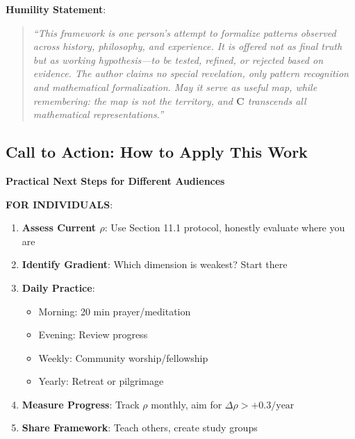 \documentclass[11pt,a4paper]{article}
\theoremstyle{definition}
\theoremstyle{remark}
\begin{document}
\begin{small}
\begin{enumerate}
\begin{protocol}
\begin{mdframed}[backgroundcolor=red!10,linewidth=2pt]
\textbf{Humility Statement}:
\begin{quote}
\textit{``This framework is one person's attempt to formalize patterns observed across history, philosophy, and experience. It is offered not as final truth but as working hypothesis—to be tested, refined, or rejected based on evidence. The author claims no special revelation, only pattern recognition and mathematical formalization. May it serve as useful map, while remembering: the map is not the territory, and \(\mathbf{C}\) transcends all mathematical representations.''}
\end{quote}
\end{mdframed}

\subsection{Call to Action: How to Apply This Work}

\begin{mdframed}[backgroundcolor=green!10,linewidth=2pt]
\textbf{Practical Next Steps for Different Audiences}

\textbf{FOR INDIVIDUALS}:
\begin{enumerate}
    \item \textbf{Assess Current \(\rho\)}: Use Section 11.1 protocol, honestly evaluate where you are
    \item \textbf{Identify Gradient}: Which dimension is weakest? Start there
    \item \textbf{Daily Practice}: 
        \begin{itemize}[nosep]
            \item Morning: 20 min prayer/meditation
            \item Evening: Review progress
            \item Weekly: Community worship/fellowship
            \item Yearly: Retreat or pilgrimage
        \end{itemize}
    \item \textbf{Measure Progress}: Track \(\rho\) monthly, aim for \(\Delta\rho > +0.3/\text{year}\)
    \item \textbf{Share Framework}: Teach others, create study groups
\end{enumerate}


\end{mdframed}
\end{protocol}
\end{enumerate}
\end{small}
\end{document}
